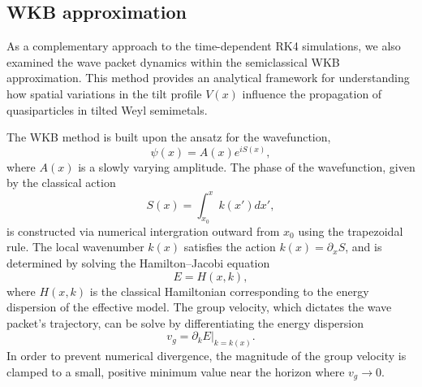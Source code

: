 \documentclass[%
 aip,
 amsmath,amssymb,
 reprint,%
]{revtex4-1}
\begin{document}
\subsection{WKB approximation}

As a complementary approach to the time-dependent RK4 simulations, we also examined the wave packet dynamics within the semiclassical WKB approximation. This method provides an analytical framework for understanding how spatial variations in the tilt profile $V(x)$ influence the propagation of quasiparticles in tilted Weyl semimetals.

The WKB method is built upon the ansatz for the wavefunction,
\begin{equation}
\label{eq:WKB_ansatz}
\psi(x) = A(x) e^{i S(x)},
\end{equation}
where $A(x)$ is a slowly varying amplitude. The phase of the wavefunction, given by the classical action
\begin{equation}
S(x) = \int^{x}_{x_0} k(x') dx',
\end{equation}
is constructed via numerical intergration outward from $x_0$ using the trapezoidal rule. The local wavenumber $k(x)$ satisfies the action $k(x)=\partial_x S$, and is determined by solving the Hamilton–Jacobi equation
\begin{equation}
E = H(x,k),
\end{equation}
where $H(x,k)$ is the classical Hamiltonian corresponding to the energy dispersion of the effective model. The group velocity, which dictates the wave packet's trajectory, can be solve by differentiating the energy dispersion
\begin{equation}
v_g = \partial_k E\bigg|_{k = k(x)}.
\end{equation}
In order to prevent numerical divergence, the magnitude of the group velocity is clamped to a small, positive minimum value near the horizon where $v_g \rightarrow 0$.
\end{document}
